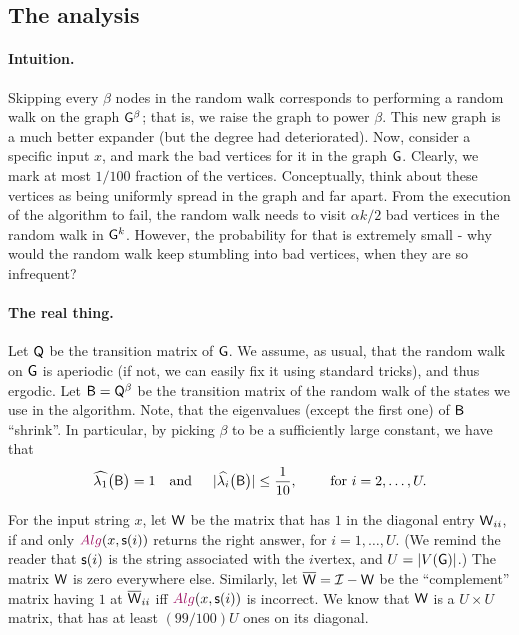 \subsection{The analysis}

\paragraph*{Intuition.}

Skipping every $\beta$ nodes in the random walk corresponds to
performing a random walk on the graph $\mathsf{G}^\beta$; that is, we
raise the graph to power $\beta$. This new graph is a much better
expander (but the degree had deteriorated). Now, consider a specific
input $x$, and mark the bad vertices for it in the graph
$\mathsf{G}$. Clearly, we mark at most $1/100$ fraction of the
vertices. Conceptually, think about these vertices as being uniformly
spread in the graph and far apart. From the execution of the algorithm
to fail, the random walk needs to visit $\alpha k/2$ bad vertices in
the random walk in $\mathsf{G}^k$. However, the probability for that is
extremely small - why would the random walk keep stumbling into bad
vertices, when they are so infrequent?



\paragraph*{The real thing.}

Let $\mathsf{Q}$ be the transition matrix of $\mathsf{G}$. We assume, as
usual, that the random walk on $\mathsf{G}$ is aperiodic (if not, we can
easily fix it using standard tricks), and thus ergodic. Let $\mathsf{B} =
\mathsf{Q}^\beta$ be the transition matrix of the random walk of the
states we use in the algorithm. Note, that the eigenvalues (except the
first one) of $\mathsf{B}$ ``shrink''. In particular, by picking $\beta$
to be a sufficiently large constant, we have that 
\begin{equation*}
  \TEV{1}\pth{\bigl. \BMtrx} =1%
  \text{\quad and \quad}%
  \cardin{\smash{\EV{i}\pth{\bigl.\BMtrx}}} \leq \frac{1}{10},%
  \qquad \text{ for }i=2,\ldots, U.
\end{equation*}

For the input string $x$, let $\mathsf{W}$ be the matrix that has $1$ in
the diagonal entry $\mathsf{W}_{ii}$, if and only $\Alg(x, \StringX{i})$
returns the right answer, for $i=1,\ldots, U$. (We remind the reader
that $\StringX{i}$ is the string associated with the $i$\th vertex,
and $U =\cardin{\VerticesX{\Graph}}$.)  The matrix $\mathsf{W}$ is zero
everywhere else. Similarly, let $\overline{\mathsf{W}} =\mathcal{I} - \mathsf{W}$ be the
``complement'' matrix having $1$ at $\overline{\mathsf{W}}_{ii}$ iff $\Alg(x,
\StringX{i})$ is incorrect. We know that $\mathsf{W}$ is a $U \times U$
matrix, that has at least $(99/100)U$ ones on its diagonal.

